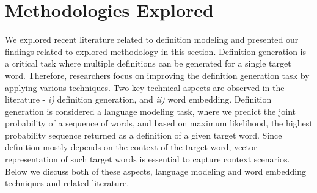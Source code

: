 \section{Methodologies Explored}
We explored recent literature related to definition modeling and presented our findings related to explored methodology in this section. Definition generation is a critical task where multiple definitions can be generated for a single target word. Therefore, researchers focus on improving the definition generation task by applying various techniques. Two key technical aspects are observed in the literature -\emph{ i)} definition generation, and \emph{ii)} word embedding. Definition generation is considered a language modeling task, where we predict the joint probability of a  sequence of words, and based on maximum likelihood, the highest probability sequence returned as a definition of a given target word. Since definition mostly depends on the context of the target word, vector representation of such target words is essential to capture context scenarios. Below we discuss both of these aspects, language modeling and word embedding techniques and related literature.


